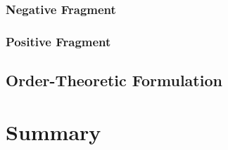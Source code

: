 \documentclass[11pt]{article}
\begin{document}
\subsubsection{Negative Fragment}\label{subsubsec:ipl_negfrag}

\subsubsection{Positive Fragment}\label{subsubsec:ipl_posfrag}

\subsection{Order-Theoretic Formulation}\label{subsec:ipl_order}

\section{Summary}\label{sec:summary}




\end{document}
